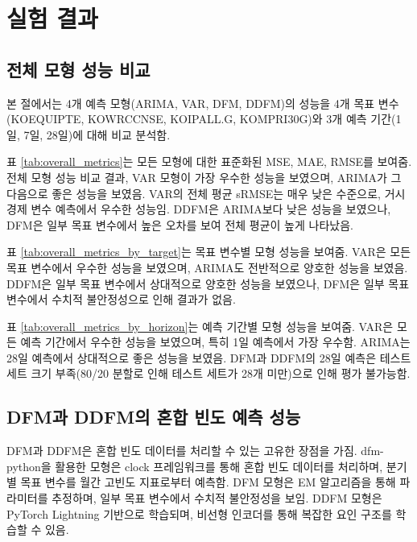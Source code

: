 \section{실험 결과}
\label{sec:results}

\subsection{전체 모형 성능 비교}

본 절에서는 4개 예측 모형(ARIMA, VAR, DFM, DDFM)의 성능을 4개 목표 변수(KOEQUIPTE, KOWRCCNSE, KOIPALL.G, KOMPRI30G)와 3개 예측 기간(1일, 7일, 28일)에 대해 비교 분석함.

표 \ref{tab:overall_metrics}는 모든 모형에 대한 표준화된 MSE, MAE, RMSE를 보여줌. 전체 모형 성능 비교 결과, VAR 모형이 가장 우수한 성능을 보였으며, ARIMA가 그 다음으로 좋은 성능을 보였음. VAR의 전체 평균 sRMSE는 매우 낮은 수준으로, 거시경제 변수 예측에서 우수한 성능임. DDFM은 ARIMA보다 낮은 성능을 보였으나, DFM은 일부 목표 변수에서 높은 오차를 보여 전체 평균이 높게 나타났음.



표 \ref{tab:overall_metrics_by_target}는 목표 변수별 모형 성능을 보여줌. VAR은 모든 목표 변수에서 우수한 성능을 보였으며, ARIMA도 전반적으로 양호한 성능을 보였음. DDFM은 일부 목표 변수에서 상대적으로 양호한 성능을 보였으나, DFM은 일부 목표 변수에서 수치적 불안정성으로 인해 결과가 없음.



표 \ref{tab:overall_metrics_by_horizon}는 예측 기간별 모형 성능을 보여줌. VAR은 모든 예측 기간에서 우수한 성능을 보였으며, 특히 1일 예측에서 가장 우수함. ARIMA는 28일 예측에서 상대적으로 좋은 성능을 보였음. DFM과 DDFM의 28일 예측은 테스트 세트 크기 부족(80/20 분할로 인해 테스트 세트가 28개 미만)으로 인해 평가 불가능함.



\subsection{DFM과 DDFM의 혼합 빈도 예측 성능}

DFM과 DDFM은 혼합 빈도 데이터를 처리할 수 있는 고유한 장점을 가짐. dfm-python을 활용한 모형은 clock 프레임워크를 통해 혼합 빈도 데이터를 처리하며, 분기별 목표 변수를 월간 고빈도 지표로부터 예측함. DFM 모형은 EM 알고리즘을 통해 파라미터를 추정하며, 일부 목표 변수에서 수치적 불안정성을 보임. DDFM 모형은 PyTorch Lightning 기반으로 학습되며, 비선형 인코더를 통해 복잡한 요인 구조를 학습할 수 있음.

